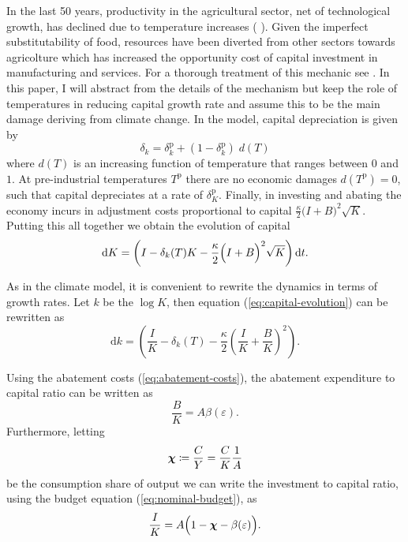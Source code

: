 \documentclass[../../main.tex]{subfiles}
\begin{document}
In the last 50 years, productivity in the agricultural sector, net of technological growth, has declined due to temperature increases (\citeauthor{dellemperature_2012} \citeyear{dellemperature_2012, dellemperature_2009}). Given the imperfect substitutability of food, resources have been diverted from other sectors towards agricolture which has increased the opportunity cost of capital investment in manufacturing and services. For a thorough treatment of this mechanic see . In this paper, I will abstract from the details of the mechanism but keep the role of temperatures in reducing capital growth rate and assume this to be the main damage deriving from climate change. In the model, capital depreciation is given by \begin{equation}
    \delta_k = \delta^{\mathrm{p}}_k + (1 - \delta^{\mathrm{p}}_k) \; d(T)
\end{equation} where $d(T)$ is an increasing function of temperature that ranges between $0$ and $1$. At pre-industrial temperatures $T^{\mathrm{p}}$ there are no economic damages $d(T^{\mathrm{p}}) = 0$, such that capital depreciates at a rate of $\delta^{\mathrm{p}}_K$. Finally, in investing and abating the economy incurs in adjustment costs proportional to capital $\frac{\kappa}{2} \big(I + B \big)^2 \sqrt{K}$. Putting this all together we obtain the evolution of capital \begin{equation} \label{eq:capital-evolution}
    \mathrm{d}K = \left( I - \delta_k(T) K - \frac{\kappa}{2} \Big(I + B\Big)^2 \sqrt{K} \right) \mathrm{d}t.
\end{equation} 

As in the climate model, it is convenient to rewrite the dynamics in terms of growth rates. Let $k$ be the $\log K$, then equation (\ref{eq:capital-evolution}) can be rewritten as \begin{equation} \label{eq:capital-evolution:log:level}
    \text{d}k = \left( \frac{I}{K} - \delta_k(T) - \frac{\kappa}{2} \left(\frac{I}{K} + \frac{B}{K}\right)^2 \right).
\end{equation}

Using the abatement costs (\ref{eq:abatement-costs}), the abatement expenditure to capital ratio can be written as \begin{equation}
    \frac{B}{K} = A \beta(\varepsilon).
\end{equation} Furthermore, letting \begin{equation}
    \bm{\chi} \coloneqq \frac{C}{Y} = \frac{C}{K} \frac{1}{A}
\end{equation} be the consumption share of output we can write the investment to capital ratio, using the budget equation (\ref{eq:nominal-budget}), as \begin{equation}
    \frac{I}{K} = A \Big(1 - \bm{\chi} - \beta(\varepsilon)\Big).
\end{equation}
\end{document}
